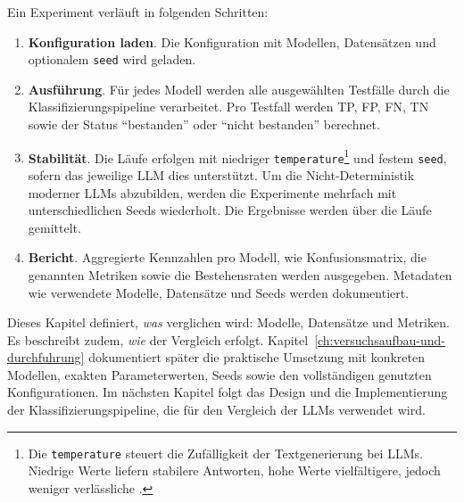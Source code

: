 Ein Experiment verläuft in folgenden Schritten:

\begin{enumerate}
    \item \textbf{Konfiguration laden}. Die Konfiguration mit Modellen, Datensätzen und optionalem \texttt{seed} wird geladen.
    \item \textbf{Ausführung}. Für jedes Modell werden alle ausgewählten Testfälle durch die Klassifizierungspipeline verarbeitet. Pro Testfall werden \ac{TP}, \ac{FP}, \ac{FN}, \ac{TN} sowie der Status \enquote{bestanden} oder \enquote{nicht bestanden} berechnet.
    \item \textbf{Stabilität}. Die Läufe erfolgen mit niedriger \texttt{temperature}\footnote{Die \texttt{temperature} steuert die Zufälligkeit der Textgenerierung bei \acp{LLM}. Niedrige Werte liefern stabilere Antworten, hohe Werte vielfältigere, jedoch weniger verlässliche \cite{ibm-llm-temperature}.} und festem \texttt{seed}, sofern das jeweilige \ac{LLM} dies unterstützt. Um die Nicht-Deterministik moderner \acp{LLM} abzubilden, werden die Experimente mehrfach mit unterschiedlichen Seeds wiederholt. Die Ergebnisse werden über die Läufe gemittelt.
    \item \textbf{Bericht}. Aggregierte Kennzahlen pro Modell, wie Konfusionsmatrix, die genannten Metriken sowie die Bestehensraten werden ausgegeben. Metadaten wie verwendete Modelle, Datensätze und Seeds werden dokumentiert.
\end{enumerate}

Dieses Kapitel definiert, \emph{was} verglichen wird: Modelle, Datensätze und Metriken. Es beschreibt zudem, \emph{wie} der Vergleich erfolgt. Kapitel~\ref{ch:versuchsaufbau-und-durchfuhrung} dokumentiert später die praktische Umsetzung mit konkreten Modellen, exakten Parameterwerten, Seeds sowie den vollständigen genutzten Konfigurationen. Im nächsten Kapitel folgt das Design und die Implementierung der Klassifizierungspipeline, die für den Vergleich der \acp{LLM} verwendet wird.